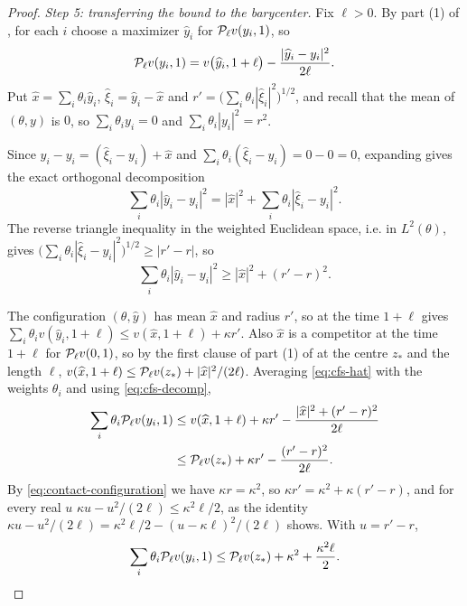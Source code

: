 \begin{proof}
\emph{Step 5: transferring the bound to the barycenter.}
Fix $\ell>0$. By part (1) of , for each $i$ choose a
maximizer $\widehat y_i$ for $\mathcal{P}_\ell v(y_i,1)$, so
\begin{equation}\label{eq:cfs-hat}
  \mathcal{P}_\ell v(y_i,1)=v\bigl(\widehat y_i,1+\ell\bigr)
      -\frac{|\widehat y_i-y_i|^2}{2\ell}.
\end{equation}
Put $\widehat x=\sum_i\theta_i\widehat y_i$,
$\widehat\xi_i=\widehat y_i-\widehat x$ and
$r'=\bigl(\sum_i\theta_i|\widehat\xi_i|^2\bigr)^{1/2}$, and recall that the mean
of $(\theta,y)$ is $0$, so $\sum_i\theta_iy_i=0$ and
$\sum_i\theta_i|y_i|^2=r^2$.

Since $\widehat y_i-y_i=(\widehat\xi_i-y_i)+\widehat x$ and
$\sum_i\theta_i(\widehat\xi_i-y_i)=0-0=0$, expanding gives the exact orthogonal
decomposition
\[
  \sum_i\theta_i|\widehat y_i-y_i|^2
   =|\widehat x|^2+\sum_i\theta_i|\widehat\xi_i-y_i|^2 .
\]
The reverse triangle inequality in the weighted Euclidean space, i.e. in
$L^2(\theta)$, gives
$\bigl(\sum_i\theta_i|\widehat\xi_i-y_i|^2\bigr)^{1/2}\ge|r'-r|$, so
\begin{equation}\label{eq:cfs-decomp}
  \sum_i\theta_i|\widehat y_i-y_i|^2\ge|\widehat x|^2+(r'-r)^2 .
\end{equation}

The configuration $(\theta,\widehat y)$ has mean $\widehat x$ and radius $r'$, so
 at the time $1+\ell$ gives
$\sum_i\theta_iv(\widehat y_i,1+\ell)\le v(\widehat x,1+\ell)+\kappa r'$. Also
$\widehat x$ is a competitor at the time $1+\ell$ for $\mathcal{P}_\ell v(0,1)$, so by
the first clause of part (1) of  at the centre
$z_*$ and the length $\ell$,
$v(\widehat x,1+\ell)\le\mathcal{P}_\ell v(z_*)+|\widehat x|^2/(2\ell)$. Averaging
\eqref{eq:cfs-hat} with the weights $\theta_i$ and using
\eqref{eq:cfs-decomp},
\[
\begin{aligned}
  \sum_i\theta_i\mathcal{P}_\ell v(y_i,1)
  &\le v(\widehat x,1+\ell)+\kappa r'
     -\frac{|\widehat x|^2+(r'-r)^2}{2\ell}\\
  &\le\mathcal{P}_\ell v(z_*)+\kappa r'-\frac{(r'-r)^2}{2\ell}.
\end{aligned}
\]
By \eqref{eq:contact-configuration} we have $\kappa r=\kappa^2$, so
$\kappa r'=\kappa^2+\kappa(r'-r)$, and for every real $u$
$\kappa u-u^2/(2\ell)\le\kappa^2\ell/2$, as the identity
$\kappa u-u^2/(2\ell)=\kappa^2\ell/2-(u-\kappa\ell)^2/(2\ell)$ shows. With
$u=r'-r$,
\begin{equation}\label{eq:cfs-key}
  \sum_i\theta_i\mathcal{P}_\ell v(y_i,1)
   \le\mathcal{P}_\ell v(z_*)+\kappa^2+\frac{\kappa^2\ell}{2}.
\end{equation}


\end{proof}
